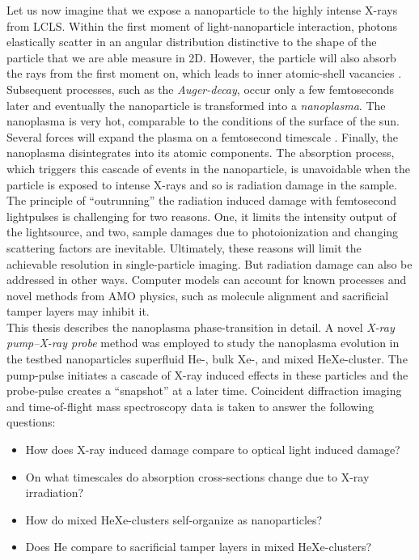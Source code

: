 %
Let us now imagine that we expose a nanoparticle to the highly intense X-rays from LCLS. Within the first moment of light-nanoparticle interaction, photons elastically scatter in an angular distribution distinctive to the shape of the particle that we are able measure in 2D. However, the particle will also absorb the rays from the first moment on, which leads to inner atomic-shell vacancies \citep{Young-2010-Nature}. Subsequent processes, such as the \textit{Auger-decay}, occur only a few femtoseconds later and eventually the nanoparticle is transformed into a \textit{nanoplasma}. The nanoplasma is very hot, comparable to the conditions of the surface of the sun. Several forces will expand the plasma on a femtosecond timescale \citep{Gorkhover-2016-NatPho}. Finally, the nanoplasma disintegrates into its atomic components. The absorption process, which triggers this cascade of events in the nanoparticle, is unavoidable when the particle is exposed to intense X-rays and so is radiation damage in the sample.\\[1\baselineskip]
%
The principle of ``outrunning'' the radiation induced damage with femtosecond lightpulses is challenging for two reasons. One, it limits the intensity output of the lightsource, and two, sample damages due to photoionization and changing scattering factors are inevitable. Ultimately, these reasons will limit the achievable resolution in single-particle imaging. But radiation damage can also be addressed in other ways. Computer models can account for known processes \citep{Quiney-2010-NatPhys} and novel methods from AMO physics, such as molecule alignment \citep{Kupper-2014-PRL} and sacrificial tamper layers \citep{Hau-Riege-2004-PRE,Hau-Riege-2010-PRL} may inhibit it.\\[1\baselineskip]
%
This thesis describes the nanoplasma phase-transition in detail. A novel \textit{X-ray pump--X-ray probe} method was employed to study the nanoplasma evolution in the testbed nanoparticles superfluid He-, bulk Xe-, and mixed HeXe-cluster. The pump-pulse initiates a cascade of X-ray induced effects in these particles and the probe-pulse creates a ``snapshot'' at a later time. Coincident diffraction imaging and time-of-flight mass spectroscopy data is taken to answer the following questions:
\begin{itemize}
	\item How does X-ray induced damage compare to optical light induced damage?
	\item On what timescales do absorption cross-sections change due to X-ray irradiation?
	\item How do mixed HeXe-clusters self-organize as nanoparticles?
	\item Does He compare to sacrificial tamper layers in mixed HeXe-clusters?
\end{itemize}
